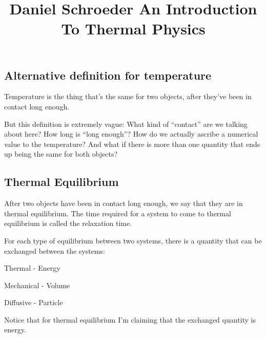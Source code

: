 \documentclass{../template/texnote}
\title{Daniel Schroeder An Introduction To Thermal Physics}
\begin{document}
    \maketitle {}

\section{}

\subsection{Alternative definition for temperature}
Temperature is the thing that’s the same for two objects, after they’ve  been in contact long enough.

But this definition  is extremely vague: What kind of ``contact'' are we talking about here? How long is  ``long enough''? How do we actually ascribe a numerical value to the temperature?  And what if there is more than one quantity that ends up being the same for both objects?

\subsection{Thermal Equilibrium}
After two objects have been in contact long enough, we say that they are in  thermal equilibrium.  The time required for a system to come to thermal equilibrium is called the  relaxation time.

For each type of equilibrium between  two systems, there is a quantity that can be exchanged between the systems:

Thermal - Energy

Mechanical - Volume

Diffusive - Particle

Notice that for thermal equilibrium I’m claiming that the exchanged quantity is  energy.

    \printbibliography
\end{document}
